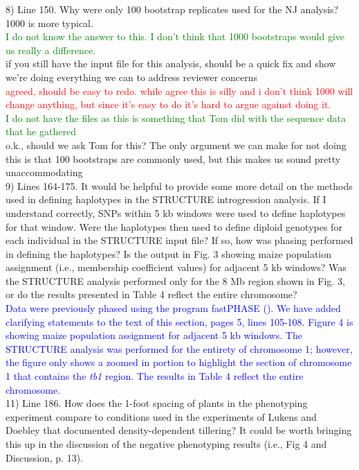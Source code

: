 \documentclass[11pt]{article}
\newcommand{\res}[1]{\noindent \textcolor{blue}{{#1}} \\}
\newcommand{\jri}[1]{\noindent \textcolor{red}{{#1}} \\}
\newcommand{\lev}[1]{\noindent \textcolor{green}{{#1}} \\}
\newcommand{\mbh}[1]{\noindent \textcolor{Dandelion}{{#1}}\\}
\begin{document}
8) Line 150. Why were only 100 bootstrap replicates used for the NJ analysis? 1000 is more typical.\\
\lev{I do not know the answer to this. I don't think that 1000 bootstraps would give us really a difference.}
\mbh{if you still have the input file for this analysis, should be a quick fix and show we're doing everything we can to address reviewer concerns}
\jri{agreed, should be easy to redo. while agree this is silly and i don't think 1000 will change anything, but since it's easy to do it's hard to argue against doing it.}
\lev{I do not have the files as this is something that Tom did with the sequence data that he gathered}
\mbh{o.k., should we ask Tom for this? The only argument we can make for not doing this is that 100 bootstraps are commonly used, but this makes us sound pretty unaccommodating}

9) Lines 164-175. It would be helpful to provide some more detail on the methods used in defining haplotypes in the STRUCTURE introgression analysis. If I understand correctly, SNPs within 5 kb windows were used to define haplotypes for that window. Were the haplotypes then used to define diploid genotypes for each individual in the STRUCTURE input file? If so, how was phasing performed in defining the haplotypes? Is the output in Fig. 3 showing maize population assignment (i.e., membership coefficient values) for adjacent 5 kb windows? Was the STRUCTURE analysis performed only for the 8 Mb region shown in Fig. 3, or do the results presented in Table 4 reflect the entire chromosome? \\

\res{Data were previously phased using the program fastPHASE (\citet{Pyhajarvi2013, Scheet2006}). We have added clarifying statements to the text of this section, pages 5, lines 105-108. Figure 4 is showing maize population assignment for adjacent 5 kb windows. The STRUCTURE analysis was performed for the entirety of chromosome 1; however, the figure only shows a zoomed in portion to highlight the section of chromosome 1 that contains the \emph{tb1} region. The results in Table 4 reflect the entire chromosome.}

11) Line 186. How does the 1-foot spacing of plants in the phenotyping experiment compare to conditions used in the experiments of Lukens and Doebley that documented density-dependent tillering? It could be worth bringing this up in the discussion of the negative phenotyping results (i.e., Fig 4 and Discussion, p. 13). \\
\end{document}
